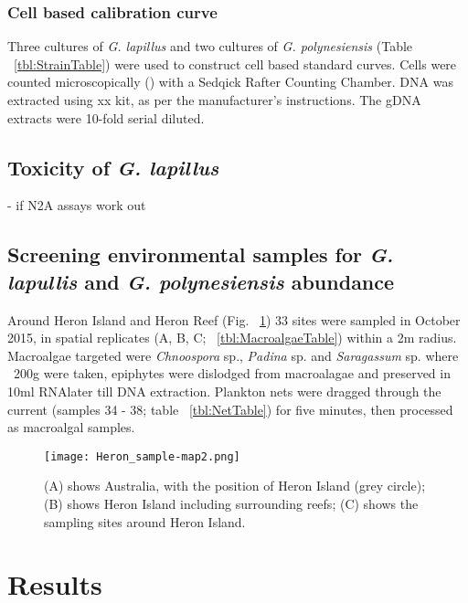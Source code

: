 \documentclass[12pt]{article}
\begin{document}
\subsubsection{Cell based calibration curve}
Three cultures of \emph{G. lapillus} and two cultures of \emph{G. polynesiensis} (Table ~\ref{tbl:StrainTable}) were used to construct cell based standard curves. Cells were counted microscopically () with a Sedqick Rafter Counting Chamber. DNA was extracted using xx kit, as per the manufacturer's instructions. The gDNA extracts were 10-fold serial diluted.
\subsection{Toxicity of \emph{G. lapillus}}
- if N2A assays work out
\subsection{Screening environmental samples for \emph{G. lapullis} and \emph{G. polynesiensis} abundance}
Around Heron Island and Heron Reef (Fig. ~\ref{fig:samplesites}) 33 sites were sampled in October 2015, in spatial replicates (A, B, C; ~\ref{tbl:MacroalgaeTable}) within a 2m radius. Macroalgae targeted were \textit{Chnoospora} sp., \textit{Padina} sp. and \textit{Saragassum} sp. where ~200g were taken, epiphytes were dislodged from macroalagae and preserved in 10ml RNAlater till DNA extraction.
Plankton nets were dragged through the current (samples 34 - 38; table ~\ref{tbl:NetTable}) for five minutes, then processed as macroalgal samples.

\FloatBarrier 
\begin{figure} 
\texttt{[image: Heron\_sample-map2.png]} 
\caption{(A) shows Australia, with the position of Heron Island (grey circle); (B) shows Heron Island including surrounding reefs; (C) shows the sampling sites around Heron Island.} 
\label{fig:samplesites}
\end{figure} 
\FloatBarrier

\newpage
\section{Results}
\end{document}
